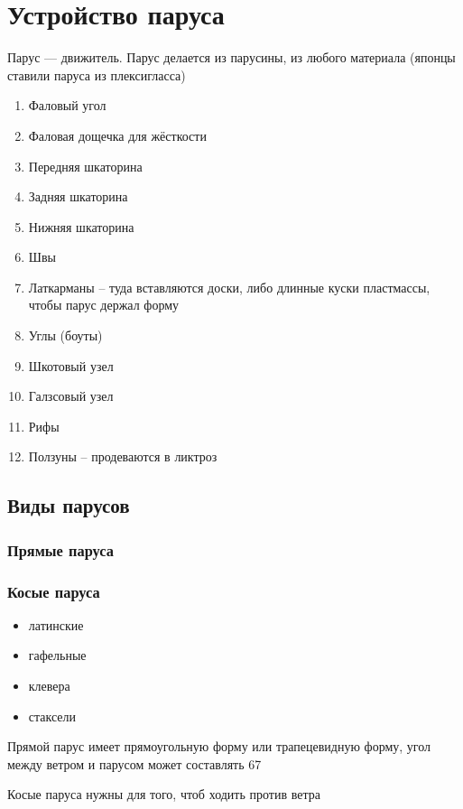 \documentclass{article}        %
\begin{document}

\section{Устройство паруса}          
Парус --- движитель. 
Парус делается из парусины, из любого материала 
(японцы ставили паруса из плексигласса)

\begin{enumerate}
	\item Фаловый угол 
	\item Фаловая дощечка для жёсткости 
	\item Передняя шкаторина
	\item Задняя шкаторина
	\item Нижняя шкаторина
	\item Швы
	\item Латкарманы -- туда вставляются доски, либо длинные куски пластмассы, чтобы парус держал форму
	\item Углы (боуты)
	\item Шкотовый узел
	\item Галзсовый узел
	\item Рифы
	\item Ползуны -- продеваются в ликтроз
\end{enumerate}

\subsection{Виды парусов}
\subsubsection{Прямые паруса}
\subsubsection{Косые паруса}
\begin{itemize}
	\item латинские
\item гафельные
	\item клевера
	\item стаксели
\end{itemize}

Прямой парус имеет прямоугольную форму или трапецевидную форму, угол между ветром и парусом может составлять 67\degree 

Косые паруса нужны для того, чтоб ходить против ветра
\end{document}
